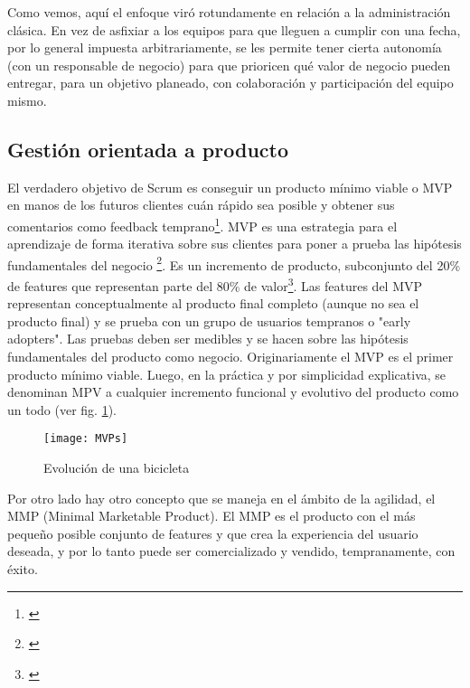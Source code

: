 Como vemos, aquí el enfoque viró rotundamente en relación a la administración clásica. En vez de asfixiar a los equipos para que lleguen a cumplir con una fecha, por lo general impuesta arbitrariamente, se les permite tener cierta autonomía (con un responsable de negocio) para que prioricen qué valor de negocio pueden entregar, para un objetivo planeado, con colaboración y participación del equipo mismo.

\subsection{Gestión orientada a producto}

El verdadero objetivo de Scrum es conseguir un producto mínimo viable o MVP en manos de los futuros clientes cuán rápido sea posible y obtener sus comentarios como feedback temprano\footnote{\cite{Jeff-Sutherland-2016}}. MVP es una estrategia para el aprendizaje de forma iterativa sobre sus clientes para poner a prueba las hipótesis fundamentales del negocio \footnote{\cite{Greg-Gehrich-2012}}. Es un incremento de producto, subconjunto del 20\% de features que representan parte del 80\% de valor\footnote{\cite{Jeff-Sutherland-2016}}. Las features del MVP representan conceptualmente al producto final completo (aunque no sea el producto final) y se prueba con un grupo de usuarios tempranos o "early adopters". Las pruebas deben ser medibles y se hacen sobre las hipótesis fundamentales del producto como negocio.
Originariamente el MVP es el primer producto mínimo viable. Luego, en la práctica y por simplicidad explicativa, se denominan MPV a cualquier incremento funcional y evolutivo del producto como un todo (ver fig. \ref{fig:MVPs}).


\begin{figure}[h]
  \centering
  \texttt{[image: MVPs]}
  \caption{Evolución de una bicicleta}
  \centering
  \label{fig:MVPs} %
\end{figure}
\FloatBarrier %


Por otro lado hay otro concepto que se maneja en el ámbito de la agilidad, el MMP (Minimal Marketable Product). El MMP es el producto con el más pequeño posible conjunto de features y que crea la experiencia del usuario deseada, y por lo tanto puede ser comercializado y vendido, tempranamente, con éxito.

